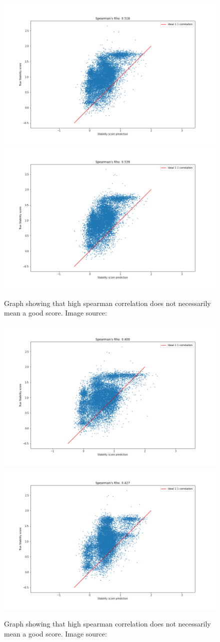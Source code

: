\begin{figure}[!ht]
  \centering
  \includegraphics[width=0.4\linewidth]{latex/imgs/spearman_2_layer_05_drop_final.png}
  \includegraphics[width=0.4\linewidth]{latex/imgs/spearman_2_layer_05_drop_minloss.png}
  \caption{Graph showing that high spearman correlation does not necessarily mean a good score. Image source:\cite{spearman}}
\end{figure}
\begin{figure}[!ht]
  \centering
  \includegraphics[width=0.4\linewidth]{latex/imgs/spearman_2_layer_no_drop_final.png}
  \includegraphics[width=0.4\linewidth]{latex/imgs/spearman_2_layer_no_drop_minloss.png}
  \caption{Graph showing that high spearman correlation does not necessarily mean a good score. Image source:\cite{spearman}}
\end{figure}
